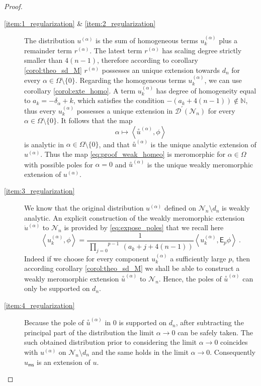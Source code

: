 \documentclass[11pt]{book}
\newcommand{\ms}{\mathsf{ms}}
\newcommand{\sm}[1]{\left\langle#1\right\rangle}
\newcommand{\exte}[1]{\overset{\circ}{#1}}
\newcommand{\Dcal}{\mathcal{D}}
\newcommand{\Ncal}{\mathcal{N}}
\newcommand{\Nbb}{\mathbb{N}}
\newcommand{\Esf}{\mathsf{E}}
\theoremstyle{break}
\begin{document}
\begin{proof}
\begin{description}
%
%
\item[\ref{item:1_regularization} \& \ref{item:2_regularization}] The distribution $u^{(\alpha)}$ is the sum of homogeneous terms $u^{(\alpha)}_k$ plus a remainder term $r^{(\alpha)}$. The latest term $r^{(\alpha)}$ has scaling degree strictly smaller than $4(n-1)$, therefore according to corollary \ref{corol:theo_sd_M} $r^{(\alpha)}$ possesses an unique extension towards $d_n$ for every $\alpha \in \Omega \setminus \{0\}$. Regarding the homogeneous terms $u^{(\alpha)}_k$, we can use corollary \ref{corol:exte_homo}. A term $u^{(\alpha)}_k$ has degree of homogeneity equal to $a_k = -\delta_\alpha + k$, which satisfies the condition $-\left(a_k+4(n-1)\right) \notin \Nbb$, thus every $u^{(\alpha)}_k$ possesses a unique extension in $\Dcal^\prime(\Ncal_n)$ for every $\alpha \in \Omega \setminus \{0\}$. It follows that the map
%
\begin{equation}
\alpha \mapsto \sm{\exte{u}^{(\alpha)} , \phi} 
\label{eq:proof_weak_homeo}
\end{equation}
%
is analytic in $\alpha \in \Omega \setminus \{0\}$, and that $\exte{u}^{(\alpha)}$ is the unique analytic extension of $u^{(\alpha)}$. Thus the map \eqref{eq:proof_weak_homeo} is meromorphic for $\alpha \in \Omega$ with possible poles for $\alpha=0$ and $\exte{u}^{(\alpha)}$ is the unique weakly meromorphic extension of $u^{(\alpha)}$.%
%
%
\item[\ref{item:3_regularization}] We know that the original distribution $u^{(\alpha)}$ defined on $\Ncal_n\setminus d_n$ is weakly analytic. An explicit construction of the weakly meromorphic extension $\dot{u}^{(\alpha)}$ to $\Ncal_n$ is provided by 
\eqref{eq:expose_poles} that we recall here%
%
\begin{equation*}%
\sm{ u^{(\alpha)}_k, \phi } = \frac{1}{\overset{p-1}{\ \underset{j=0}{\prod}} \ (a_k+j+4(n-1))}   \sm{ u^{(\alpha)}_k, \Esf_p \phi } \ .%
\end{equation*}%
%
Indeed if we choose for every component $u^{(\alpha)}_k$ a sufficiently large $p$, then according corollary \ref{corol:theo_sd_M} we shall be able to construct a weakly meromorphic extension $\exte{u}^{(\alpha)}$ to $\Ncal_n$. Hence, the poles of $\exte{u}^{(\alpha)}$ can only be supported on $d_n$.%
%
%
\item[\ref{item:4_regularization}] Because the pole of $\exte{u}^{(\alpha)}$ in $0$ is supported on $d_n$, after subtracting the principal part of the distribution the limit $\alpha \to 0$ can be safely taken. The such obtained distribution prior to considering the limit $\alpha \to 0$ coincides with $u^{(\alpha)}$ on $\Ncal_n\setminus d_n$ and the same holds in the limit $\alpha\to 0$. Consequently $u_\ms$ is an extension of $u$.\par%

\end{description}
\end{proof}
\end{document}
